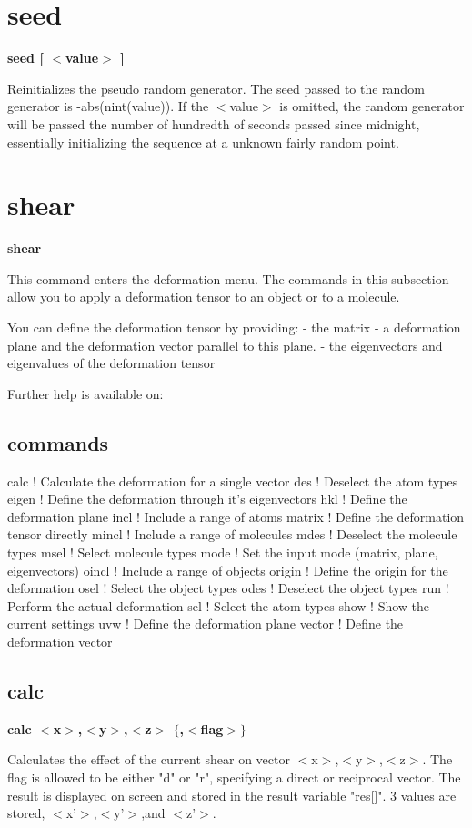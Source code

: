 \section{seed}
{\bf seed [ $ <$value$> $ ] \par }
\par
\vspace{3pt}
Reinitializes the pseudo random generator. The seed passed to the 
random generator is -abs(nint(value)). If the $ <$value$> $ is omitted, 
the random generator will be passed the number of hundredth of 
seconds passed since midnight, essentially initializing the sequence 
at a unknown fairly random point. 
\section{shear}
{\bf shear \par }
\par
\vspace{3pt}
This command enters the deformation menu. The commands in this 
subsection allow you to apply a deformation tensor to an object 
or to a molecule. 
\par
You can define the deformation tensor by providing: 
- the matrix 
- a deformation plane and the deformation vector parallel to this plane. 
- the eigenvectors and eigenvalues of the deformation tensor 
\par
Further help is available on: 
\subsection*{commands}
\begin{MacVerbatim}
calc    ! Calculate the deformation for a single vector
des     ! Deselect the atom types
eigen   ! Define the deformation through it's eigenvectors
hkl     ! Define the deformation plane
incl    ! Include a range of atoms
matrix  ! Define the deformation tensor directly
mincl   ! Include a range of molecules
mdes    ! Deselect the molecule types
msel    ! Select molecule types
mode    ! Set the input mode (matrix, plane, eigenvectors)
oincl   ! Include a range of objects
origin  ! Define the origin for the deformation
osel    ! Select the object types
odes    ! Deselect the object types
run     ! Perform the actual deformation
sel     ! Select the atom types
show    ! Show the current settings
uvw     ! Define the deformation plane
vector  ! Define the deformation vector
\end{MacVerbatim}
\subsection*{calc}
{\bf calc $ <$x$> $,$ <$y$> $,$ <$z$> $ $ \{$,$ <$flag$> $$\} $ \par }
\par
\vspace{3pt}
Calculates the effect of the current shear on vector $ <$x$> $,$ <$y$> $,$ <$z$> $. 
The flag is allowed to be either "d" or "r", specifying a direct 
or reciprocal vector. 
The result is displayed on screen and stored in the result 
variable "res[]". 3 values are stored, $ <$x'$> $,$ <$y'$> $,and $ <$z'$> $. 
